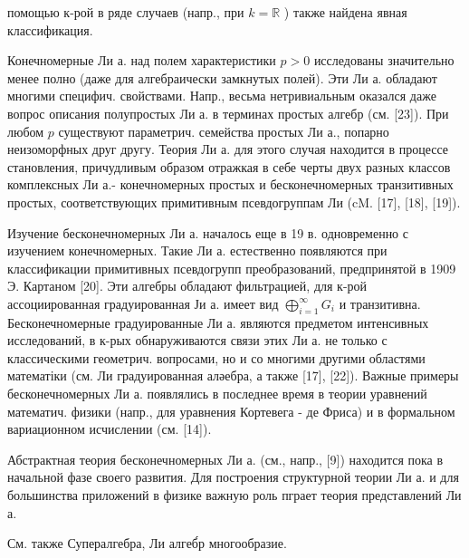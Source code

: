 \documentclass[10pt]{article}
\begin{document}
помощью к-рой в ряде случаев (напр., при $k=\mathbb{R}$ ) также найдена явная классификация.



Конечномерные Ли а. над полем характеристики $p>0$ исследованы значительно менее полно (даже для алгебраически замкнутых полей). Эти Ли а. обладают многими специфич. свойствами. Напр., весьма нетривиальным оказался даже вопрос описания полупростых Ли а. в терминах простых алгебр (см. [23]). При любом $p$ существуют параметрич. семейства простых Ли а., попарно неизоморфных друг другу. Теория Ли а. для этого случая находится в процессе становления, причудливым образом отражкая в себе черты двух разных классов комплексных Ли а.- конечномерных простых и бесконечномерных транзитивных простых, соответствующих примитивным псевдогруппам Ли (cM. [17], [18], [19]).



Изучение бесконечномерных Ли а. началось еще в 19 в. одновременно с изучением конечномерных. Такие Ли а. естественно появляются при классификации примитивных псевдогрупп преобразований, предпринятой в 1909 Э. Картаном [20]. Эти алгебры обладают фильтрацией, для к-рой ассоциированная градуированная Ји а. имеет вид $\bigoplus_{i=1}^{\infty} G_{i}$ и транзитивна. Бесконечномерные градуированные Ли а. являются предметом интенсивных исследований, в к-рых обнаруживаются связи этих Ли а. не только с классическими геометрич. вопросами, но и со многими другими областями математіки (см. Ли градуированная аләебра, а также [17], [22]). Важные примеры бесконечномерных Ли а. появлялись в последнее время в теории уравнений математич. физики (напр., для уравнения Кортевега - де Фриса) и в формальном вариационном исчислении (см. [14]).



Абстрактная теория бесконечномерных Ли а. (см., напр., [9]) находится пока в начальной фазе своего развития. Для построения структурной теории Ли а. и для большинства приложений в физике важную роль пграет теория представлений Ли а.



См. также Супералгебра, Ли алгеб́р многообразие.
\end{document}

